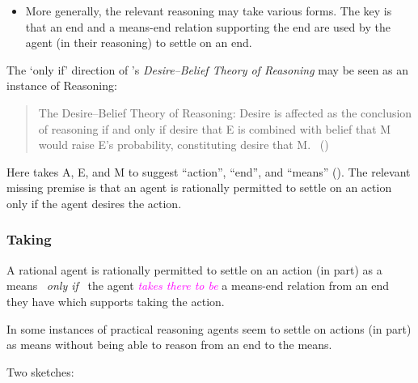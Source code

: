 \documentclass[10pt]{article}
\newenvironment{beamerblock}[1]{%
  \tcolorbox[standard,%
  no shadow,
  noparskip,
  colback=white,
  colframe=black,
  colbacktitle=white,
  coltitle=black,
  colupper=black,
  size=small,
  boxrule=.125mm,
  fonttitle=\bfseries,
  sharp corners=all,
  title=#1]}%
{\endtcolorbox}
\newcommand{\hozlinedash}[0]{%
  \noindent\hdashrule[0.5ex][c]{\textwidth}{.1pt}{2.5pt}
}
\newcommand{\schemaName}[1]{\textsf{#1}}
\begin{document}
\hozlinedash

\begin{itemize}
\item More generally, the relevant reasoning may take various forms.
  The key is that an end and a means-end relation supporting the end are used by the agent (in their reasoning) to settle on an end.
\end{itemize}

The `only if' direction of \citeauthor{Sinhababu:2017aa}'s \emph{Desire–Belief Theory of Reasoning} may be seen as an instance of \schemaName{Reasoning}:

\begin{quote}
  The Desire–Belief Theory of Reasoning: Desire is affected as the conclusion of reasoning if and only if desire that E is combined with belief that M would raise E’s probability, constituting desire that M.\nolinebreak
  \mbox{ }\hfill\mbox{(\citeyear[2,39]{Sinhababu:2017aa})}
\end{quote}
Here \citeauthor{Sinhababu:2017aa} takes A, E, and M to suggest ``action'', ``end'', and ``means'' (\citeyear[2]{Sinhababu:2017aa}).
The relevant missing premise is that an agent is rationally permitted to settle on an action only if the agent desires the action.


\hozlinedash

\subsubsection{Taking}
\label{sec:taking}

\begin{beamerblock}{\schemaName{Taking}}
  A rational agent is rationally permitted to settle on an action (in part) as a means
  \newline
  \mbox{ }\hfill\emph{only if}\hfill\mbox{ }
  \newline
  the agent \textcolor{fuchsia}{\emph{takes there to be}} a means-end relation from an end they have which supports taking the action.
\end{beamerblock}

\hozlinedash

In some instances of practical reasoning agents seem to settle on actions (in part) as means without being able to reason from an end to the means.

Two sketches:
\end{document}
